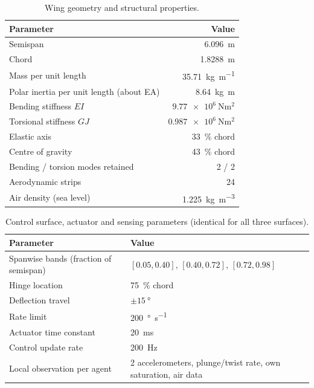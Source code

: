 \documentclass[11pt]{article}
\begin{document}
\begin{table}[h]
\centering
\caption{Wing geometry and structural properties.}
\label{tab:params-wing}
\begin{tabular}{lr}
\toprule
Parameter & Value \\
\midrule
Semispan & \SI{6.096}{\metre} \\
Chord & \SI{1.8288}{\metre} \\
Mass per unit length & \SI{35.71}{\kilo\gram\per\metre} \\
Polar inertia per unit length (about EA) & \SI{8.64}{\kilo\gram\metre} \\
Bending stiffness $EI$ & $\SI{9.77e6}{\newton\metre\squared}$ \\
Torsional stiffness $GJ$ & $\SI{0.987e6}{\newton\metre\squared}$ \\
Elastic axis & \SI{33}{\percent} chord \\
Centre of gravity & \SI{43}{\percent} chord \\
Bending / torsion modes retained & 2 / 2 \\
Aerodynamic strips & 24 \\
Air density (sea level) & \SI{1.225}{\kilo\gram\per\cubic\metre} \\
\bottomrule
\end{tabular}
\end{table}

\begin{table}[h]
\centering
\caption{Control surface, actuator and sensing parameters (identical for all
three surfaces).}
\label{tab:params-actuator}
\begin{tabular}{@{}lp{6.0cm}@{}}
\toprule
Parameter & Value \\
\midrule
Spanwise bands (fraction of semispan) & $[0.05,0.40]$, $[0.40,0.72]$, $[0.72,0.98]$ \\
Hinge location & \SI{75}{\percent} chord \\
Deflection travel & $\pm\SI{15}{\degree}$ \\
Rate limit & \SI{200}{\degree\per\second} \\
Actuator time constant & \SI{20}{\milli\second} \\
Control update rate & \SI{200}{\hertz} \\
Local observation per agent & 2 accelerometers, plunge/twist rate, own
saturation, air data \\
\bottomrule
\end{tabular}
\end{table}
\end{document}
